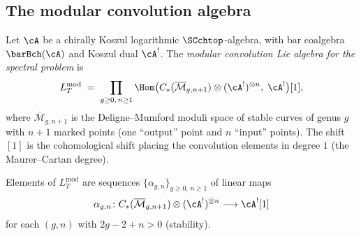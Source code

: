 \subsection{The modular convolution algebra}

\begin{definition}
Let $\cA$ be a chirally Koszul logarithmic $\SCchtop$-algebra, with bar
coalgebra $\barBch(\cA)$ and Koszul dual $\cA^!$. The
\emph{modular convolution Lie algebra for the spectral problem} is
\begin{equation}
L_T^{\mathrm{mod}}
\;=\;
\prod_{g \ge 0,\, n \ge 1}
\Hom\bigl(
C_\ast(\overline{\mathcal{M}}_{g, n+1})
\otimes (\cA^!)^{\otimes n},\;
\cA^!
\bigr)[1],
\end{equation}
where $\overline{\mathcal{M}}_{g,n+1}$ is the Deligne--Mumford
moduli space of stable curves of genus $g$ with $n+1$ marked
points (one ``output'' point and $n$ ``input'' points). The
shift $[1]$ is the cohomological shift placing the convolution
elements in degree $1$ (the Maurer--Cartan degree).

Elements of $L_T^{\mathrm{mod}}$ are sequences
$\{\alpha_{g,n}\}_{g \ge 0,\, n \ge 1}$ of linear maps
\[
\alpha_{g,n} \colon
C_\ast(\overline{\mathcal{M}}_{g,n+1})
\otimes (\cA^!)^{\otimes n}
\longrightarrow \cA^![1]
\]
for each $(g,n)$ with $2g - 2 + n > 0$ (stability).
\end{definition}

